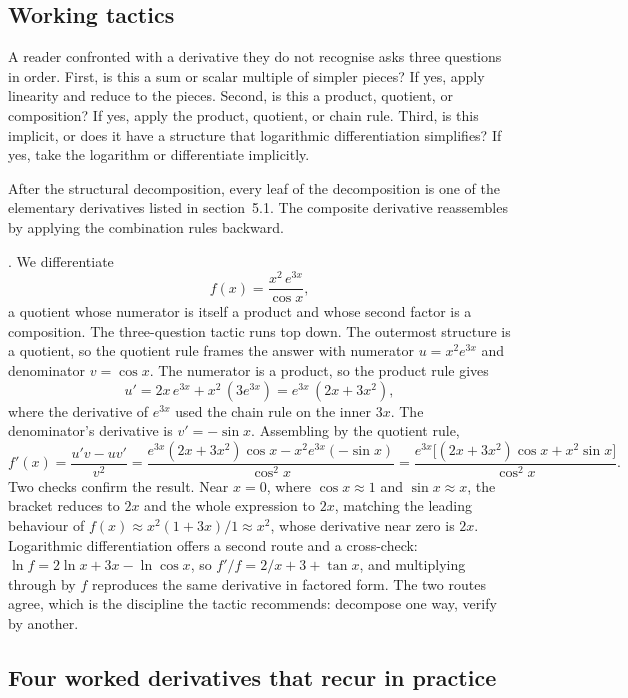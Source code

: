 \subsection{Working tactics}

A reader confronted with a derivative they do not recognise asks
three questions in order. First, is this a sum or scalar multiple
of simpler pieces? If yes, apply linearity and reduce to the
pieces. Second, is this a product, quotient, or composition? If
yes, apply the product, quotient, or chain rule. Third, is this
implicit, or does it have a structure that logarithmic
differentiation simplifies? If yes, take the logarithm or
differentiate implicitly.

After the structural decomposition, every leaf of the
decomposition is one of the elementary derivatives listed in
section~5.1. The composite derivative reassembles by applying the
combination rules backward.

. We differentiate
\[
f(x) = \frac{x^{2}\, e^{3x}}{\cos x},
\]
a quotient whose numerator is itself a product and whose second
factor is a composition. The three-question tactic runs top down.
The outermost structure is a quotient, so the quotient rule frames
the answer with numerator $u = x^{2} e^{3x}$ and denominator
$v = \cos x$. The numerator is a product, so the product rule gives
\[
u' = 2x\, e^{3x} + x^{2}\,(3 e^{3x}) = e^{3x}\,(2x + 3x^{2}),
\]
where the derivative of $e^{3x}$ used the chain rule on the inner
$3x$. The denominator's derivative is $v' = -\sin x$. Assembling by
the quotient rule,
\[
f'(x) = \frac{u'v - uv'}{v^{2}} =
\frac{e^{3x}(2x + 3x^{2})\cos x - x^{2} e^{3x}(-\sin x)}{\cos^{2}x}
= \frac{e^{3x}\bigl[(2x + 3x^{2})\cos x + x^{2}\sin x\bigr]}
{\cos^{2}x}.
\]
Two checks confirm the result. Near $x = 0$, where $\cos x \approx 1$
and $\sin x \approx x$, the bracket reduces to $2x$ and the whole
expression to $2x$, matching the leading behaviour of
$f(x) \approx x^{2}(1 + 3x)/1 \approx x^{2}$, whose derivative near
zero is $2x$. Logarithmic differentiation offers a second route and
a cross-check: $\ln f = 2\ln x + 3x - \ln\cos x$, so
$f'/f = 2/x + 3 + \tan x$, and multiplying through by $f$ reproduces
the same derivative in factored form. The two routes agree, which is
the discipline the tactic recommends: decompose one way, verify by
another.

\subsection{Four worked derivatives that recur in practice}

